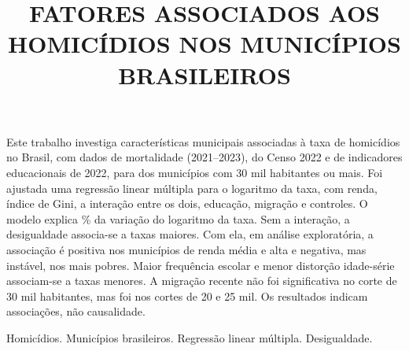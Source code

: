 \documentclass[a4paper,11pt]{article}
\title{FATORES ASSOCIADOS AOS HOMICÍDIOS NOS MUNICÍPIOS BRASILEIROS}
\begin{document}
\maketitle

\author{
}

\author{
}

\author{
}

\author{
}

\author{
}

{
\vspace{6pt}
}
\vspace{8mm}
\begin{resumo}
Este trabalho investiga características municipais associadas à taxa de homicídios no Brasil, com dados de mortalidade (2021--2023), do Censo 2022 e de indicadores educacionais de 2022, para \nMunEsc{} dos \nMunCorte{} municípios com 30 mil habitantes ou mais. Foi ajustada uma regressão linear múltipla para o logaritmo da taxa, com renda, índice de Gini, a interação entre os dois, educação, migração e controles. O modelo explica \nRdoisPct\% da variação do logaritmo da taxa. Sem a interação, a desigualdade associa-se a taxas maiores. Com ela, em análise exploratória, a associação é positiva nos municípios de renda média e alta e negativa, mas instável, nos mais pobres. Maior frequência escolar e menor distorção idade-série associam-se a taxas menores. A migração recente não foi significativa no corte de 30 mil habitantes, mas foi nos cortes de 20 e 25 mil. Os resultados indicam associações, não causalidade.

\end{resumo}

\bigskip
\begin{palchaves}
Homicídios. Municípios brasileiros. Regressão linear múltipla. Desigualdade.
\end{palchaves}

\vspace{8mm}
\end{document}
